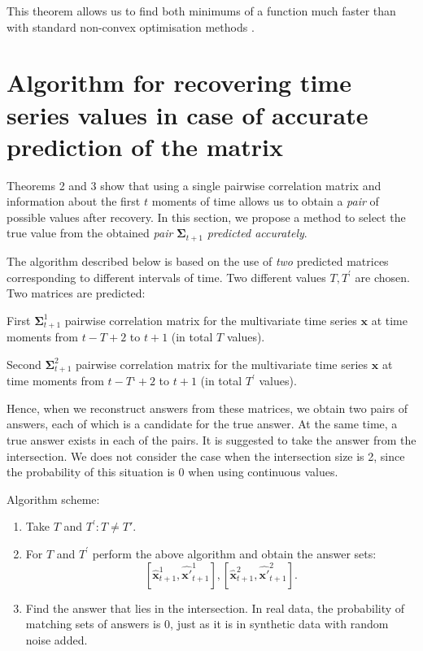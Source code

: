 \documentclass{article}
\begin{document}
{This theorem allows us to find both minimums of a function much faster than with standard non-convex optimisation methods \cite{mikhalevich2024methodsnonconvexoptimization}.

\section{Algorithm for recovering time series values in case of accurate prediction of the matrix}

Theorems 2 and 3 show that using a single pairwise correlation matrix and information about the first $t$ moments of time allows us to obtain a \textit{pair} of possible values after recovery. In this section, we propose a method to select the true value from the obtained \textit{pair} $\mathbf{\Sigma}_{t+1}$ \textit{predicted accurately}.

The algorithm described below is based on the use of \textit{two} predicted matrices corresponding to different intervals of time. Two different values $T, T^\prime$ are chosen. Two matrices are predicted:

First $\mathbf{\Sigma}_{t+1}^1$ pairwise correlation matrix for the multivariate time series $\mathbf{x}$ at time moments from $t-T+2$ to $t+1$ (in total $T$ values).

Second $\mathbf{\Sigma}_{t+1}^2$ pairwise correlation matrix for the multivariate time series $\mathbf{x}$ at time moments from $t-T‘+2$ to $t+1$ (in total $T^\prime$ values).

Hence, when we reconstruct answers from these matrices, we obtain two pairs of answers, each of which is a candidate for the true answer. At the same time, a true answer exists in each of the pairs. It is suggested to take the answer from the intersection. We does not consider the case when the intersection size is 2, since the probability of this situation is 0 when using continuous values.

Algorithm scheme:

\begin{enumerate}
	\item Take $T$ and $T^\prime: T \neq T'$.
	\item For $T$ and $T^\prime$ perform the above algorithm and obtain the answer sets: \[ [\hat{\mathbf{x}}_{t+1}^1, \hat{\mathbf{x}'}_{t+1}^1], [\hat{\mathbf{x}}_{t+1}^2, \hat{\mathbf{x}'}_{t+1}^2].\]
	\item Find the answer that lies in the intersection.
	In real data, the probability of matching sets of answers is 0, just as it is in synthetic data with random noise added.
\end{enumerate}


}
\end{document}
